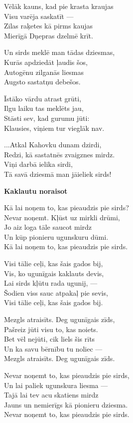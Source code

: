\documentclass[11pt]{article}
\begin{document}
Vēlāk kauns, kad pie krasta kraujas\\
Visu varēja saskatīt ---\\
Zilas raķetes kā pirms kaujas\\
Mierīgā Dņepras dzelmē krīt.

Un sirds meklē man tādas dziesmas,\\
Kurās apdziedāt ļaudis šos,\\
Autogēnu zilganās liesmas\\
Augsto sastatņu debešos.

Īstāko vārdu atrast grūti,\\
Ilgu laiku tas meklēts jau,\\
Stāsti sev, kad gurumu jūti:\\
Klausies, viņiem tur vieglāk nav.

...Atkal Kahovku dunam dzirdi,\\
Redzi, kā sastatnēs zvaigznes mirdz.\\
Viņi darbā ielika sirdi,\\
Tā savā dziesmā man jāieliek sirds!

\newpage

{\bf Kaklautu noraisot}

Kā lai noņem to, kas pieaudzis pie sirds?\\
Nevar noņemt. Kļūst uz mirkli drūmi,\\
Jo aiz loga tāle saucot mirdz\\
Un kūp pionieru ugunskuru dūmi.\\
Kā lai noņem to, kas pieaudzis pie sirds.

Visi tālie ceļi, kas šais gados bij,\\
Vis, ko ugunīgais kaklauts devis,\\
Lai sirds kļūtu rada ugunij, ---\\
Šodien viss sauc atpakaļ pie sevis,\\
Visi tālie ceļi, kas šais gados bij.

Mezgls atraisīts. Deg ugunīgais zīds,\\
Pašreiz jūti visu to, kas noiets.\\
Bet vēl nejūti, cik liels šis rīts\\
Un ka savu bērnību tu noliec ---\\
Mezgls atraisīts. Deg ugunīgais zīds.

Nevar noņemt to, kas pieaudzis pie sirds,\\
Un lai paliek ugunskura liesma ---\\
Tajā lai tev acu skatiens mirdz\\
Jauns un nemierīgs kā pionieru dziesma.\\
Nevar noņemt to, kas pieaudzis pie sirds.
\end{document}
